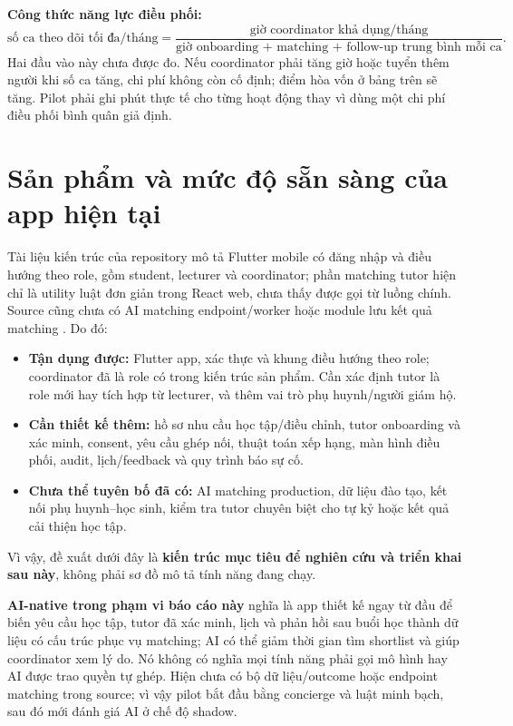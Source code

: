 \documentclass[11pt,a4paper]{article}
\begin{document}
\textbf{Công thức năng lực điều phối:}
\[
  \text{số ca theo dõi tối đa/tháng}
  = \frac{\text{giờ coordinator khả dụng/tháng}}
  {\text{giờ onboarding + matching + follow-up trung bình mỗi ca}}.
\]
Hai đầu vào này chưa được đo. Nếu coordinator phải tăng giờ hoặc tuyển thêm
người khi số ca tăng, chi phí không còn cố định; điểm hòa vốn ở bảng trên sẽ
tăng. Pilot phải ghi phút thực tế cho từng hoạt động thay vì dùng một chi phí
điều phối bình quân giả định.

\section{Sản phẩm và mức độ sẵn sàng của app hiện tại}

Tài liệu kiến trúc của repository mô tả Flutter mobile có đăng nhập và điều
hướng theo role, gồm student, lecturer và coordinator; phần matching tutor
hiện chỉ là utility luật đơn giản trong React web, chưa thấy được gọi từ luồng
chính. Source cũng chưa có AI matching endpoint/worker hoặc module lưu kết quả
matching \cite{spmarchitecture2026}. Do đó:

\begin{itemize}
  \item \textbf{Tận dụng được:} Flutter app, xác thực và khung điều hướng theo
  role; coordinator đã là role có trong kiến trúc sản phẩm. Cần xác định tutor
  là role mới hay tích hợp từ lecturer, và thêm vai trò phụ huynh/người giám hộ.
  \item \textbf{Cần thiết kế thêm:} hồ sơ nhu cầu học tập/điều chỉnh, tutor
  onboarding và xác minh, consent, yêu cầu ghép nối, thuật toán xếp hạng, màn
  hình điều phối, audit, lịch/feedback và quy trình báo sự cố.
  \item \textbf{Chưa thể tuyên bố đã có:} AI matching production, dữ liệu đào
  tạo, kết nối phụ huynh--học sinh, kiểm tra tutor chuyên biệt cho tự kỷ hoặc
  kết quả cải thiện học tập.
\end{itemize}

Vì vậy, đề xuất dưới đây là \textbf{kiến trúc mục tiêu để nghiên cứu và triển
khai sau này}, không phải sơ đồ mô tả tính năng đang chạy.

\textbf{AI-native trong phạm vi báo cáo này} nghĩa là app thiết kế ngay từ đầu
để biến yêu cầu học tập, tutor đã xác minh, lịch và phản hồi sau buổi học thành
dữ liệu có cấu trúc phục vụ matching; AI có thể giảm thời gian tìm shortlist
và giúp coordinator xem lý do. Nó không có nghĩa mọi tính năng phải gọi mô hình
hay AI được trao quyền tự ghép. Hiện chưa có bộ dữ liệu/outcome hoặc endpoint
matching trong source; vì vậy pilot bắt đầu bằng concierge và luật minh bạch,
sau đó mới đánh giá AI ở chế độ shadow.
\end{document}
